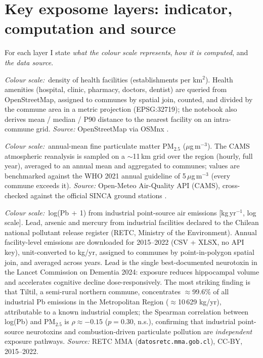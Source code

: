 \documentclass[10pt,a4paper]{article}
\let\citep\parencite
\newcommand{\colorbarval}[1]{\textit{Colour scale:}~#1}
\begin{document}
\section{Key exposome layers: indicator, computation and source}
\label{sec:layers}

For each layer I state \emph{what the colour scale represents}, \emph{how it is computed}, and \emph{the data source}.

\begin{description}[leftmargin=0pt,labelsep=0.4em,itemsep=4pt,style=nextline]

\item[\textcolor{softpink}{Healthcare access}]
\colorbarval{density of health facilities (establishments per km$^2$).}
Health amenities (hospital, clinic, pharmacy, doctors, dentist) are queried from OpenStreetMap, assigned to communes by spatial join, counted, and divided by the commune area in a metric projection (EPSG:32719); the notebook also derives mean / median / P90 distance to the nearest facility on an intra-commune grid. \emph{Source:} OpenStreetMap via OSMnx \citep{Boeing2017,OSM2024}.

\item[\textcolor{softpink}{Air quality}]
\colorbarval{annual-mean fine particulate matter PM$_{2.5}$ ($\mu$g\,m$^{-3}$).}
The CAMS atmospheric reanalysis is sampled on a $\sim$11\,km grid over the region (hourly, full year), averaged to an annual mean and aggregated to communes; values are benchmarked against the WHO 2021 annual guideline of 5\,$\mu$g\,m$^{-3}$ (every commune exceeds it). \emph{Source:} Open-Meteo Air-Quality API (CAMS), cross-checked against the official SINCA ground stations \citep{OpenMeteo2024,CAMS2024,WHO2021,SINCA2024}.

\item[\textcolor{softpink}{Industrial heavy metals (RETC)}]
\colorbarval{log(Pb$\,+\,$1) from industrial point-source air emissions [kg\,yr$^{-1}$, log scale].}
Lead, arsenic and mercury from industrial facilities declared to the Chilean national pollutant release register (RETC, Ministry of the Environment). Annual facility-level emissions are downloaded for 2015--2022 (CSV + XLSX, no API key), unit-converted to kg/yr, assigned to communes by point-in-polygon spatial join, and averaged across years. Lead is the single best-documented neurotoxin in the Lancet Commission on Dementia 2024: exposure reduces hippocampal volume and accelerates cognitive decline dose-responsively. The most striking finding is that Tiltil, a semi-rural northern commune, concentrates $\approx$99.6\% of all industrial Pb emissions in the Metropolitan Region ($\approx$10\,629 kg/yr), attributable to a known industrial complex; the Spearman correlation between log(Pb) and PM$_{2.5}$ is $\rho\approx{-}0.15$ ($p=0.30$, n.s.), confirming that industrial point-source neurotoxins and combustion-driven particulate pollution are \emph{independent} exposure pathways. \emph{Source:} RETC MMA (\texttt{datosretc.mma.gob.cl}), CC-BY, 2015--2022.


\end{description}
\end{document}
